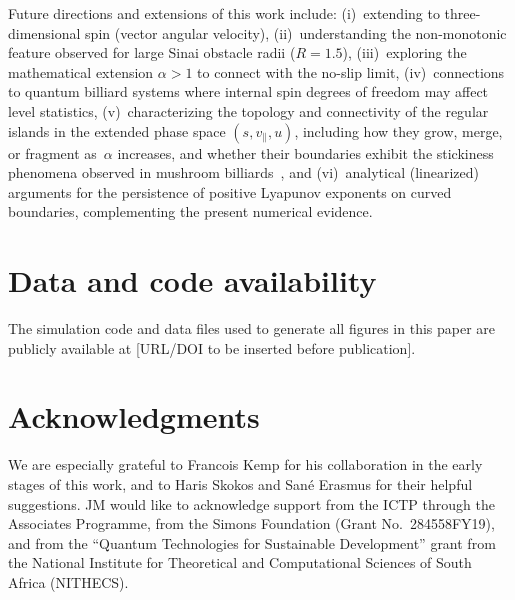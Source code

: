 \documentclass[aps,prd,twocolumn,superscriptaddress,nofootinbib,floatfix]{revtex4-2}
\begin{document}
\noindent
Future directions and extensions of this work include: (i)~extending to three-dimensional spin (vector angular velocity), (ii)~understanding the non-monotonic feature observed for large Sinai obstacle radii ($R=1.5$), (iii)~exploring the mathematical extension $\alpha > 1$ to connect with the no-slip limit, (iv)~connections to quantum billiard systems where internal spin degrees of freedom may affect level statistics, (v)~characterizing the topology and connectivity of the regular islands in the extended phase space $(s, v_\parallel, u)$, including how they grow, merge, or fragment as~$\alpha$ increases, and whether their boundaries exhibit the stickiness phenomena observed in mushroom billiards~\cite{altmann2005}, and (vi)~analytical (linearized) arguments for the persistence of positive Lyapunov exponents on curved boundaries, complementing the present numerical evidence.

\section*{Data and code availability}
The simulation code and data files used to generate all figures in this paper are publicly available at [URL/DOI to be inserted before publication].

\section*{Acknowledgments}
We are especially grateful to Francois Kemp for his collaboration in the early stages of this work, and to Haris Skokos and San\'e Erasmus for their helpful suggestions. JM would like to acknowledge support from the ICTP through the Associates Programme, from the Simons Foundation (Grant No.\ 284558FY19), and from the ``Quantum Technologies for Sustainable Development'' grant from the National Institute for Theoretical and Computational Sciences of South Africa (NITHECS).
\end{document}
